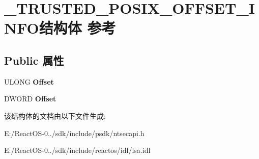 \hypertarget{struct___t_r_u_s_t_e_d___p_o_s_i_x___o_f_f_s_e_t___i_n_f_o}{}\section{\+\_\+\+T\+R\+U\+S\+T\+E\+D\+\_\+\+P\+O\+S\+I\+X\+\_\+\+O\+F\+F\+S\+E\+T\+\_\+\+I\+N\+F\+O结构体 参考}
\label{struct___t_r_u_s_t_e_d___p_o_s_i_x___o_f_f_s_e_t___i_n_f_o}
\subsection*{Public 属性}
\begin{DoxyCompactItemize}
\item 
\mbox{\label{struct___t_r_u_s_t_e_d___p_o_s_i_x___o_f_f_s_e_t___i_n_f_o_a949b87c005347cf900b3171603eb40aa}} 
U\+L\+O\+NG {\bfseries Offset}
\item 
\mbox{\label{struct___t_r_u_s_t_e_d___p_o_s_i_x___o_f_f_s_e_t___i_n_f_o_a8164e0dd0d3dcdb122fb269217f19b17}} 
D\+W\+O\+RD {\bfseries Offset}
\end{DoxyCompactItemize}


该结构体的文档由以下文件生成\+:\begin{DoxyCompactItemize}
\item 
E\+:/\+React\+O\+S-\/0../sdk/include/psdk/ntsecapi.\+h\item 
E\+:/\+React\+O\+S-\/0../sdk/include/reactos/idl/lsa.\+idl\end{DoxyCompactItemize}
